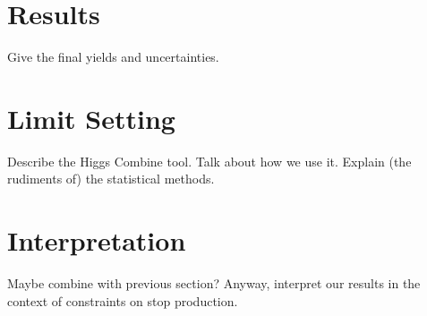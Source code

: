 \section{Results}
\label{sec:stop:results}

Give the final yields and uncertainties.

\section{Limit Setting}
\label{sec:stop:limits}

Describe the Higgs Combine tool.
Talk about how we use it.
Explain (the rudiments of) the statistical methods.

\section{Interpretation}
\label{sec:stop:interp}

Maybe combine with previous section?
Anyway, interpret our results in the context of constraints on stop production.

